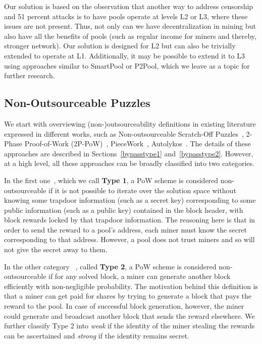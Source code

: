 \documentclass{llncs}
\begin{document}
Our solution is based on the observation that another way to address censorship and 51 percent attacks is to have pools operate at levels L2 or L3, where these issues are not present. Thus, not only can we have decentralization in mining but also have all the benefits of pools (such as regular income for miners and thereby, stronger network). Our solution is designed for L2 but can also be trivially extended to operate at L1. Additionally, it may be possible to extend it to L3 using approaches similar to SmartPool or P2Pool, which we leave as a topic for further research.

\subsection{Non-Outsourceable Puzzles}

We start with overviewing (non-)outsourceability definitions in existing literature expressed in different works, such as
Non-outsourceable Scratch-Off Puzzles~\cite{miller2015nonoutsourceable}, 2-Phase Proof-of-Work (2P-PoW)~\cite{twophase},
PieceWork~\cite{daian2017short}, Autolykos~\cite{autolykos}. The details of these approaches are described in Sections~\ref{bypasstype1} and~\ref{bypasstype2}. However, at a high level, all these approaches can be broadly classified into two categories. 

In the first one~\cite{autolykos,daian2017short,twophase}, which we call \textbf{Type 1}, a PoW scheme is considered
non-outsourceable if it is not possible to iterate over the solution space without knowing some trapdoor information (such as a secret key) corresponding to some public information (such as a public key) contained in the block header, with block rewards locked by that trapdoor information. The reasoning here is that in order to send the reward to a pool's address, each miner must know the secret corresponding to that address. However, a pool does not trust miners and so will not give the secret away to them. 

In the other category
~\cite{miller2015nonoutsourceable}, called \textbf{Type 2}, a PoW scheme is considered non-outsourceable if for any solved block, a miner can generate another block efficiently with non-negligible probability. The motivation behind this definition is that a miner can get paid for shares
by trying to generate a block that pays the reward to the pool. In case of successful block generation, however, the miner could generate and broadcast another block that sends the reward elsewhere. 
We further classify Type 2 into {\em weak} if the identity of the miner stealing the rewards can be ascertained and {\em strong} if the identity remains secret.
\end{document}
